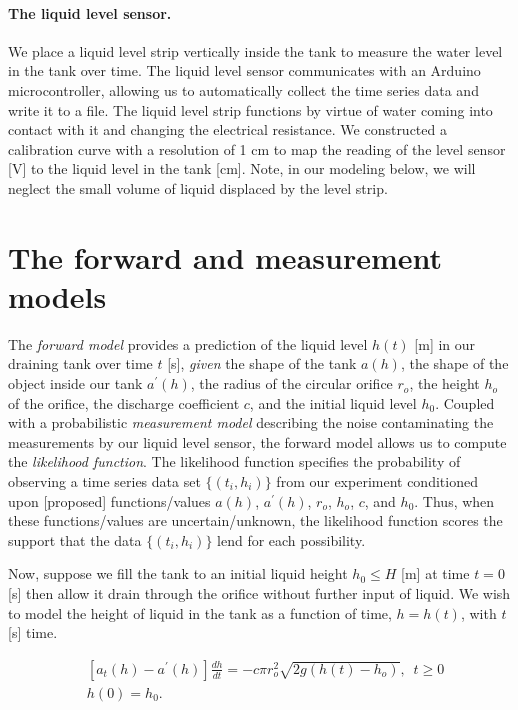 \documentclass[openacc]{rsproca_new}%
\begin{document}
\paragraph{The liquid level sensor.} We place a liquid level strip vertically inside the tank to measure the water level in the tank over time. The liquid level sensor communicates with an Arduino microcontroller, allowing us to automatically collect the time series data and write it to a file. The liquid level strip functions by virtue of water coming into contact with it and changing the electrical resistance. 
We constructed a calibration curve with a resolution of 1 cm to map the reading of the level sensor [V] to the liquid level in the tank [cm]. 
Note, in our modeling below, we will neglect the small volume of liquid displaced by the level strip.

\section{The forward and measurement models}
The \emph{forward model} provides a prediction of the liquid level $h(t)$ [m] in our draining tank over time $t$ [s], \emph{given} the shape of the tank $a(h)$, the shape of the object inside our tank $a^\prime(h)$, the radius of the circular orifice $r_o$, the height $h_o$ of the orifice, the discharge coefficient $c$, and the initial liquid level $h_0$. 
Coupled with a probabilistic \emph{measurement model} describing the noise contaminating the measurements by our liquid level sensor, the forward model allows us to compute the \emph{likelihood function}. The likelihood function specifies the probability of observing a time series data set $\{(t_i, h_i)\}$ from our experiment conditioned upon [proposed] functions/values $a(h)$, $a^\prime(h)$, $r_o$, $h_o$, $c$, and $h_0$. Thus, when these functions/values are uncertain/unknown, the likelihood function scores the support that the data $\{(t_i, h_i)\}$ lend for each possibility.

Now, suppose we fill the tank to an initial liquid height $h_0 \leq H$ [m] at time $t=0$ [s] then allow it drain through the orifice without further input of liquid. We wish to model the height of liquid in the tank as a function of time, $h=h(t)$, with $t$ [s] time. 

\begin{align}
& [a_t(h)-a^\prime(h)]\frac{dh}{dt}= -c \pi r_o^2 \sqrt{2g (h(t)-h_o)}, \,\,\, t \geq 0 \\
& h(0)=h_0.
\end{align}
\end{document}
